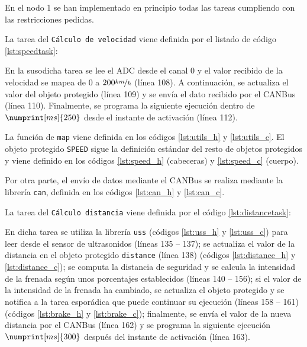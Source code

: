 En el nodo 1 se han implementado en principio todas las tareas cumpliendo con las
restricciones pedidas.

La tarea del \texttt{Cálculo de velocidad} viene definida por el listado de código
\ref{lst:speedtask}:



En la susodicha tarea se lee el ADC desde el canal 0 y el valor recibido de la velocidad
se mapea de $0$ a $200 \nicefrac{km}{h}$ (línea 108). A continuación, se actualiza el valor del
objeto protegido (línea 109) y se envía el dato recibido por el CANBus (línea 110).
Finalmente, se programa la siguiente ejecución dentro de $\numprint[ms]{250}$ desde el
instante de activación (línea 112).

La función de \texttt{map} viene definida en los códigos \ref{lst:utils_h} y \ref{lst:utils_c}.
El objeto protegido \texttt{SPEED} sigue la definición estándar del resto de objetos
protegidos y viene definido en los códigos \ref{lst:speed_h} (cabeceras) y \ref{lst:speed_c}
(cuerpo).

Por otra parte, el envío de datos mediante el CANBus se realiza mediante la librería
\texttt{can}, definida en los códigos \ref{lst:can_h} y \ref{lst:can_c}.

La tarea del \texttt{Cálculo distancia} viene definida por el código \ref{lst:distancetask}:



En dicha tarea se utiliza la librería \texttt{uss} (códigos \ref{lst:uss_h} y \ref{lst:uss_c})
para leer desde el sensor de ultrasonidos (líneas 135 -- 137); se actualiza el valor de la distancia en el
objeto protegido \texttt{distance} (línea 138) (códigos \ref{lst:distance_h} y \ref{lst:distance_c});
se computa la distancia de seguridad y se calcula la intensidad de la frenada
según unos porcentajes establecidos (líneas 140 -- 156); si el valor de la intensidad de
la frenada ha cambiado, se actualiza el objeto protegido y se notifica a la tarea
esporádica que puede continuar su ejecución (líneas 158 -- 161) 
(códigos \ref{lst:brake_h} y \ref{lst:brake_c}); finalmente, se
envía el valor de la nueva distancia por el CANBus (línea 162) y se programa la
siguiente ejecución $\numprint[ms]{300}$ después del instante de activación (línea 163).

